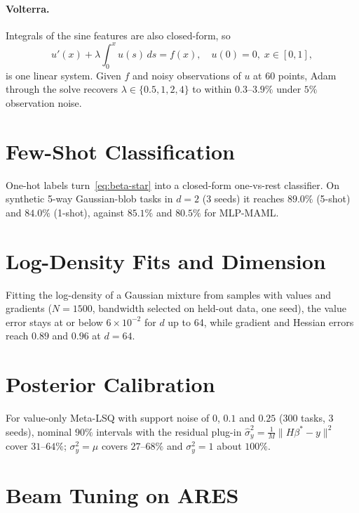 \documentclass[fullpaper,final]{nldl}
\theoremstyle{plain}
\theoremstyle{definition}
\begin{document}
\paragraph{Volterra.}
\label{app:integro}
Integrals of the sine features are also closed-form, so
\begin{equation}
\label{eq:volterra}
u'(x) + \lambda\!\int_0^x\! u(s)\,ds = f(x),\quad u(0)=0,\; x\in[0,1],
\end{equation}
is one linear system. Given $f$ and noisy observations of $u$ at 60 points, Adam
through the solve recovers $\lambda \in \{0.5,1,2,4\}$ to within $0.3$--$3.9\%$
under $5\%$ observation noise.

\section{Few-Shot Classification}
\label{app:classify}

One-hot labels turn~\eqref{eq:beta-star} into a closed-form one-vs-rest classifier.
On synthetic 5-way Gaussian-blob tasks in $d{=}2$ (3 seeds) it reaches $89.0\%$
(5-shot) and $84.0\%$ (1-shot), against $85.1\%$ and $80.5\%$ for MLP-MAML.

\section{Log-Density Fits and Dimension}
\label{app:gmm}

Fitting the log-density of a Gaussian mixture from samples with values and gradients
($N{=}1500$, bandwidth selected on held-out data, one seed), the value error stays at
or below $6\!\times\!10^{-2}$ for $d$ up to 64, while gradient and Hessian errors
reach $0.89$ and $0.96$ at $d{=}64$.

\section{Posterior Calibration}
\label{app:calib}

For value-only Meta-LSQ with support noise of $0$, $0.1$ and $0.25$ (300 tasks, 3
seeds), nominal $90\%$ intervals with the residual plug-in $\hat\sigma_y^2 =
\frac1M\|H\beta^\ast-y\|^2$ cover $31$--$64\%$; $\sigma_y^2{=}\mu$ covers $27$--$68\%$
and $\sigma_y^2{=}1$ about $100\%$.

\section{Beam Tuning on ARES}
\label{app:ares}
\end{document}
